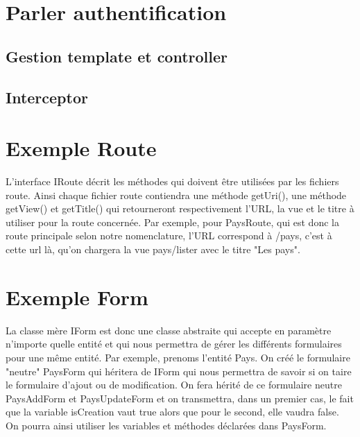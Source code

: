 	\section{Parler authentification}

		\subsection{Gestion template et controller}


		\subsection{Interceptor}


	\section{Exemple Route}

		L'interface IRoute décrit les méthodes qui doivent être utilisées par les fichiers route.
		Ainsi chaque fichier route contiendra une méthode getUri(), une méthode getView() et getTitle() qui retourneront respectivement l'URL, la vue et le titre à utiliser pour la route concernée.
		Par exemple, pour PaysRoute, qui est donc la route principale selon notre nomenclature, l'URL correspond à /pays, c'est à cette url là, qu'on chargera la vue pays/lister avec le titre "Les pays".

	\section{Exemple Form}

			La classe mère IForm est donc une classe abstraite qui accepte en paramètre n'importe quelle entité et qui nous permettra de gérer les différents formulaires pour une même entité.
			Par exemple, prenoms l'entité Pays. On créé le formulaire "neutre" PaysForm qui héritera de IForm qui nous permettra de savoir si on taire le formulaire d'ajout ou de modification.
			On fera hérité de ce formulaire neutre PaysAddForm et PaysUpdateForm et on transmettra, dans un premier cas, le fait que la variable isCreation vaut true alors que pour le second, elle vaudra false. On pourra ainsi utiliser les variables et méthodes déclarées dans PaysForm.

